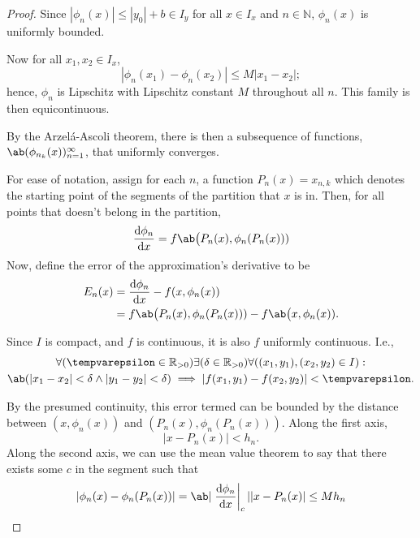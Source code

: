 \begin{proof}
  Since \(|\phi_n(x)| \leq |y_0| + b \in I_y\) for all \(x \in I_x\) and \(n \in \mathbb{N}\),
  \(\phi_n(x)\) is uniformly bounded.

  Now for all \(x_1, x_2 \in I_x\),
  \begin{equation}
    |\phi_n(x_1) - \phi_n(x_2)| \leq M|x_1 - x_2|;
  \end{equation}
  hence, \(\phi_n\) is Lipschitz with Lipschitz constant \(M\) throughout all \(n\).
  This family is then equicontinuous.

  By the Arzel\'a-Ascoli theorem, there is then a subsequence of functions,
  \(\sequence{\phi_{n_k}(x)}{n = 1}{\infty}\), that uniformly converges.

  For ease of notation, assign for each \(n\), a function \(P_n(x) = x_{n, k}\) which
  denotes the starting point of the segments of the partition that \(x\) is in. Then,
  for all points that doesn't belong in the partition,
  \begin{equation}
    \odv{\phi_n}{x} = f\ab\big(P_n(x), \phi_n(P_n(x)))
  \end{equation}
  Now, define the error of the approximation's derivative to be
  \begin{align}
    E_n(x) & = \odv{\phi_n}{x} - f(x, \phi_n(x))                          \\
           & = f\ab\big(P_n(x), \phi_n(P_n(x))) - f\ab\big(x, \phi_n(x)).
  \end{align}

  Since \(I\) is compact, and \(f\) is continuous, it is also \(f\) uniformly continuous. I.e.,
  \begin{multline}
    \forall (\epsilon \in \mathbb{R}_{>0}) \exists (\delta \in \mathbb{R}_{>0}) \forall ((x_1, y_1), (x_2, y_2) \in I) : \\
    \ab(|x_1 - x_2| < \delta \land |y_1 - y_2| < \delta) \implies |f(x_1, y_1) - f(x_2, y_2)| < \epsilon.
  \end{multline}

  By the presumed continuity, this error termed can be bounded by the distance between
  \((x, \phi_n(x))\) and \((P_n(x), \phi_n(P_n(x)))\). Along the first axis,
  \begin{equation}
    |x - P_n(x)| < h_n.
  \end{equation}
  Along the second axis, we can use the mean value theorem to say that there exists
  some \(c\) in the segment such that
  \begin{equation}
    |\phi_n(x) - \phi_n(P_n(x))| = \ab|\odv{\phi_n}{x}_c||x - P_n(x)| \leq M h_n
  \end{equation}


\end{proof}
